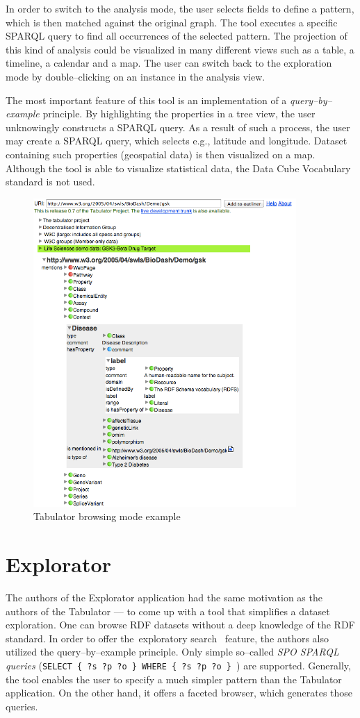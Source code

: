 In order to switch to the analysis mode, the user selects fields to define a 
pattern, which is then matched against the original graph. The tool executes a 
specific SPARQL query to find all occurrences of the selected pattern. The 
projection of this kind of analysis could be visualized in many different 
views such as a table, a timeline, a calendar and a map. The user can switch back to the 
exploration mode by double--clicking on an instance in the analysis view.

The most important feature of this tool is an implementation of a 
\emph{query--by--example} principle. By highlighting the properties in a tree view, the user 
unknowingly constructs a SPARQL query. As a 
result of such a process, the user may create a SPARQL query, which selects e.g., 
latitude and longitude. Dataset containing such properties (geospatial data)
is then visualized on a map. Although the tool is able to visualize statistical 
data, the Data Cube Vocabulary standard is not used.


\begin{figure}
	\centering
	\includegraphics[width=100mm]{img/tabulator.png}
	\caption{Tabulator browsing mode example}
	\label{fig:tabulator}
\end{figure}


\section{Explorator}
\label{sec:rw:explorator}
The authors of the Explorator application had the same motivation as the authors 
of the Tabulator --- to come up with a tool that simplifies a dataset 
exploration. One can browse RDF datasets without a deep knowledge of the RDF standard.
In order to offer the~exploratory search~\cite{exploratory-search} feature, the authors also
utilized the query--by--example principle. Only simple so--called \emph{SPO SPARQL 
queries} (\texttt{SELECT \{ ?s ?p ?o \} WHERE \{ ?s ?p ?o \} }) are supported. Generally, the tool 
enables the user to specify a much simpler pattern than the Tabulator 
application. On the other hand, it offers a faceted browser, which generates 
those queries.

